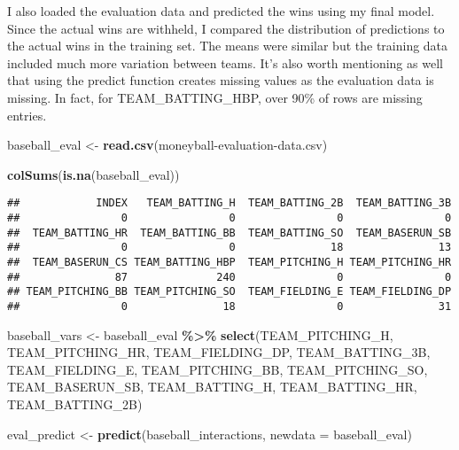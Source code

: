 \documentclass[
]{article}
\newenvironment{Shaded}{\begin{snugshade}}{\end{snugshade}}
\newcommand{\DataTypeTok}[1]{\textcolor[rgb]{0.13,0.29,0.53}{#1}}
\newcommand{\KeywordTok}[1]{\textcolor[rgb]{0.13,0.29,0.53}{\textbf{#1}}}
\newcommand{\NormalTok}[1]{#1}
\newcommand{\OperatorTok}[1]{\textcolor[rgb]{0.81,0.36,0.00}{\textbf{#1}}}
\newcommand{\StringTok}[1]{\textcolor[rgb]{0.31,0.60,0.02}{#1}}
\begin{document}
I also loaded the evaluation data and predicted the wins using my final
model. Since the actual wins are withheld, I compared the distribution
of predictions to the actual wins in the training set. The means were
similar but the training data included much more variation between
teams. It's also worth mentioning as well that using the predict
function creates missing values as the evaluation data is missing. In
fact, for TEAM\_BATTING\_HBP, over 90\% of rows are missing entries.

\begin{Shaded}
\begin{Highlighting}[]
\NormalTok{baseball\_eval \textless{}{-}}\StringTok{ }\KeywordTok{read.csv}\NormalTok{(}\StringTok{\textquotesingle{}moneyball{-}evaluation{-}data.csv\textquotesingle{}}\NormalTok{)}

\KeywordTok{colSums}\NormalTok{(}\KeywordTok{is.na}\NormalTok{(baseball\_eval))}
\end{Highlighting}
\end{Shaded}

\begin{verbatim}
##            INDEX   TEAM_BATTING_H  TEAM_BATTING_2B  TEAM_BATTING_3B 
##                0                0                0                0 
##  TEAM_BATTING_HR  TEAM_BATTING_BB  TEAM_BATTING_SO  TEAM_BASERUN_SB 
##                0                0               18               13 
##  TEAM_BASERUN_CS TEAM_BATTING_HBP  TEAM_PITCHING_H TEAM_PITCHING_HR 
##               87              240                0                0 
## TEAM_PITCHING_BB TEAM_PITCHING_SO  TEAM_FIELDING_E TEAM_FIELDING_DP 
##                0               18                0               31
\end{verbatim}

\begin{Shaded}
\begin{Highlighting}[]
\NormalTok{baseball\_vars \textless{}{-}}\StringTok{ }\NormalTok{baseball\_eval }\OperatorTok{\%\textgreater{}\%}
\StringTok{  }\KeywordTok{select}\NormalTok{(TEAM\_PITCHING\_H, TEAM\_PITCHING\_HR, TEAM\_FIELDING\_DP, TEAM\_BATTING\_3B, TEAM\_FIELDING\_E, TEAM\_PITCHING\_BB, TEAM\_PITCHING\_SO, TEAM\_BASERUN\_SB, TEAM\_BATTING\_H, TEAM\_BATTING\_HR, TEAM\_BATTING\_2B)}

\NormalTok{eval\_predict \textless{}{-}}\StringTok{ }\KeywordTok{predict}\NormalTok{(baseball\_interactions, }\DataTypeTok{newdata =}\NormalTok{ baseball\_eval)}
\end{Highlighting}
\end{Shaded}
\end{document}
